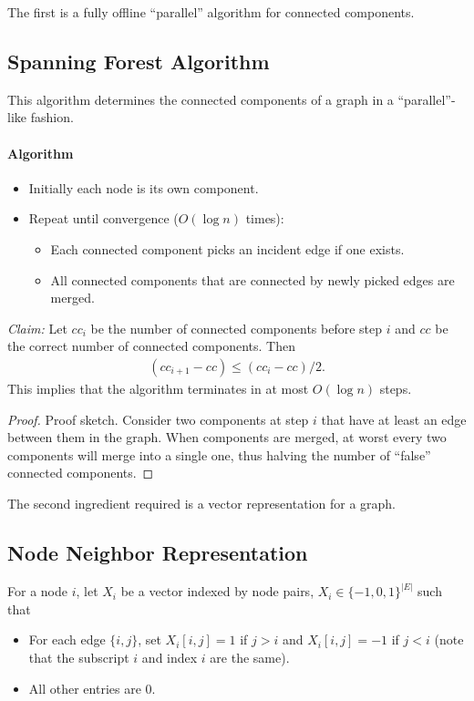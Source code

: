 \documentclass[11pt]{article}
\begin{document}
The first is a fully offline ``parallel'' algorithm for connected components.

\subsection{Spanning Forest Algorithm}
\label{sec:spanning}

This algorithm determines the connected components of a graph in a ``parallel''-like fashion.

\paragraph{Algorithm}
\begin{itemize}
\item Initially each node is its own component.
\item Repeat until convergence ($O(\log n)$ times):
  \begin{itemize}
  \item Each connected component picks an incident edge if one exists.
  \item All connected components that are connected by newly picked edges are merged.
  \end{itemize}
\end{itemize}

\emph{Claim:} Let $cc_i$ be the number of connected components before step $i$ and $cc$ be the correct number of connected components. Then
\begin{align*}
  (cc_{i+1} - cc) \leq (cc_i - cc)/2.
\end{align*}
This implies that the algorithm terminates in at most $O(\log n)$ steps.

\begin{proof}
  Proof sketch. Consider two components at step $i$ that have at least an edge between them in the graph. When components are merged, at worst every two components will merge into a single one, thus halving the number of ``false'' connected components.
\end{proof}

The second ingredient required is a vector representation for a graph.

\subsection{Node Neighbor Representation}

For a node $i$, let $X_i$ be a vector indexed by node pairs, $X_i \in \{-1, 0, 1\}^{|E|}$ such that
\begin{itemize}
\item For each edge $\{i, j\}$, set $X_i[i, j] = 1$ if $j > i$ and $X_i[i, j] = -1$ if $j < i$ (note that the subscript $i$ and index $i$ are the same).
\item All other entries are $0$.
\end{itemize}
\end{document}
